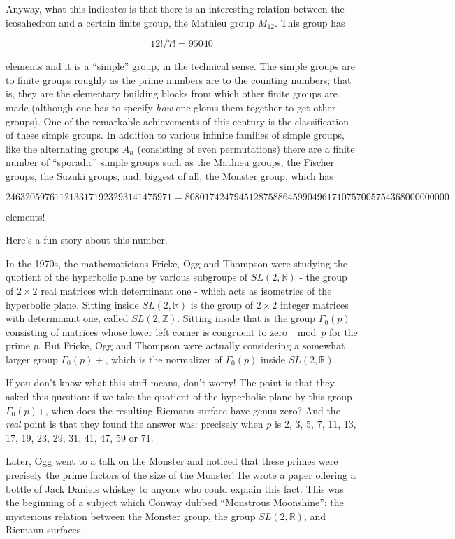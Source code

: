 \documentclass{article}
\begin{document}
Anyway, what this indicates is that there is an interesting relation
between the icosahedron and a certain finite group, the Mathieu group
\(M_{12}\). This group has

\[12!/7! = 95040\]

elements and it is a ``simple'' group, in the technical sense. The
simple groups are to finite groups roughly as the prime numbers are to
the counting numbers; that is, they are the elementary building blocks
from which other finite groups are made (although one has to specify
\emph{how} one gloms them together to get other groups). One of the
remarkable achievements of this century is the classification of these
simple groups. In addition to various infinite families of simple
groups, like the alternating groups \(A_n\) (consisting of even
permutations) there are a finite number of ``sporadic'' simple groups
such as the Mathieu groups, the Fischer groups, the Suzuki groups, and,
biggest of all, the Monster group, which has

\[246 320 59 76 112 133 17 19 23 29 31 41 47 59 71 = 808017424794512875886459904961710757005754368000000000\]

elements!

Here's a fun story about this number.

In the 1970s, the mathematicians Fricke, Ogg and Thompson were studying
the quotient of the hyperbolic plane by various subgroups of
\(SL(2,\mathbb{R})\) - the group of \(2\times2\) real matrices with
determinant one - which acts as isometries of the hyperbolic plane.
Sitting inside \(SL(2,\mathbb{R})\) is the group of \(2\times2\) integer
matrices with determinant one, called \(SL(2,\mathbb{Z})\). Sitting
inside that is the group \(\Gamma_0(p)\) consisting of matrices whose
lower left corner is congruent to zero \(\mod p\) for the prime \(p\).
But Fricke, Ogg and Thompson were actually considering a somewhat larger
group \(\Gamma_0(p)+\), which is the normalizer of \(\Gamma_0(p)\)
inside \(SL(2,\mathbb{R})\).

If you don't know what this stuff means, don't worry! The point is that
they asked this question: if we take the quotient of the hyperbolic
plane by this group \(\Gamma_0(p)\)+, when does the resulting Riemann
surface have genus zero? And the \emph{real} point is that they found
the answer was: precisely when \(p\) is 2, 3, 5, 7, 11, 13, 17, 19, 23,
29, 31, 41, 47, 59 or 71.

Later, Ogg went to a talk on the Monster and noticed that these primes
were precisely the prime factors of the size of the Monster! He wrote a
paper offering a bottle of Jack Daniels whiskey to anyone who could
explain this fact. This was the beginning of a subject which Conway
dubbed ``Monstrous Moonshine'': the mysterious relation between the
Monster group, the group \(SL(2,\mathbb{R})\), and Riemann surfaces.
\end{document}
